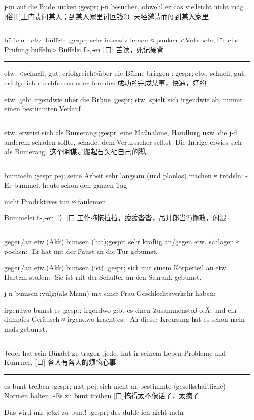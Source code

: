 j-m auf die Bude rücken ;gespr; j-n besuchen, obwohl er das vielleicht nicht mag [俗]1)上门责问某人；到某人家里讨回钱2）未经邀请而闯到某人家里

\noindent\rule{\textwidth}{1pt} 
büffeln ; etw. büffeln ;gespr; sehr intensiv lernen ≈ pauken \textless Vokabeln, für eine Prüfung büffeln\textgreater  
Büffelei f.-,-en [口] 苦读，死记硬背

\noindent\rule{\textwidth}{1pt} 
etw. \textless schnell, gut, erfolgreich\textgreater  über die Bühne bringen ; gespr; etw. schnell, gut, erfolgreich durchführen oder beenden;成功的完成某事，快速，好的

etw. geht irgendwie über die Bühne ;gespr; etw. spielt sich irgendwie ab, nimmt einen bestimmten Verlauf

\noindent\rule{\textwidth}{1pt} 
etw. erweist sich als Bumerang ;gespr; eine Maßnahme, Handlung usw. die j-d anderem schaden sollte, schadet dem Verursacher selbst
-Die Intrige erwies sich als Bumerang. 这个阴谋是搬起石头砸自己的脚。

\noindent\rule{\textwidth}{1pt} 
bummeln ;gespr pej; seine Arbeit sehr langsam (und planlos) machen ≈ trödeln:
-Er bummelt heute schon den ganzen Tag

nicht Produktives tun ≈ faulenzen

Bummelei f.-,-en 1）[口]工作拖拖拉拉，疲疲沓沓，吊儿郎当2)懒散，闲混

\noindent\rule{\textwidth}{1pt} 
gegen/an etw.(Akk) bumsen (hat);gespr; sehr kräftig an/gegen etw. schlagen ≈ pochen:
-Er hat mit der Faust an die Tür gebumst.

gegen/an etw.(Akk) bumsen (ist) ;gespr; sich mit einem Körperteil an etw. Hartem stoßen:
-Sie ist mit der Schulter an den Schrank gebumst.

j-n bumsen ;vulg;(als Mann) mit einer Frau Geschlechtsverkehr haben;

irgendwo bumst es ;gespr; irgendwo gibt es einen Zusammenstoß o.Ä. und ein dumpfes Geräusch ≈ irgendwo kracht es:
-An dieser Kreuzung hat es schon mehr mals gebumst.

\noindent\rule{\textwidth}{1pt} 
Jeder hat sein Bündel zu tragen ;jeder hat in seinem Leben Probleme und Kummer. [口] 各人有各人的烦恼心事

\noindent\rule{\textwidth}{1pt} 
es bunt treiben ;gespr; mst pej; sich nicht an bestimmte (gesellschaftliche) Normen halten; 
-Es zu bunt treiben [口]搞得太不像话了，太疯了

Das wird mir jetzt zu bunt! ;gespr; das dulde ich nicht mehr 

